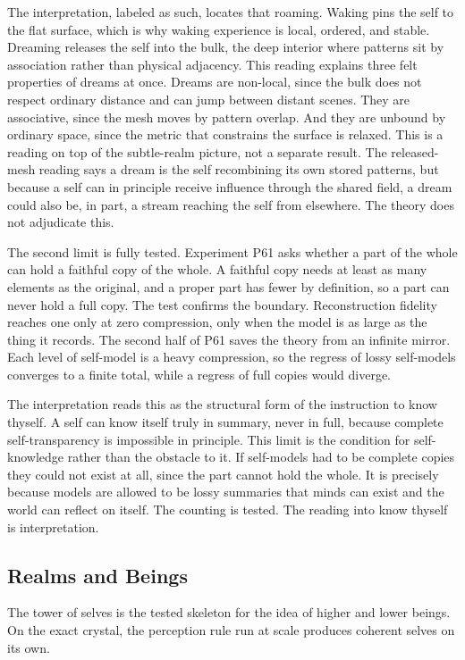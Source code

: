 The interpretation, labeled as such, locates that roaming. Waking pins the self to the flat surface, which is why waking experience is local, ordered, and stable. Dreaming releases the self into the bulk, the deep interior where patterns sit by association rather than physical adjacency. This reading explains three felt properties of dreams at once. Dreams are non-local, since the bulk does not respect ordinary distance and can jump between distant scenes. They are associative, since the mesh moves by pattern overlap. And they are unbound by ordinary space, since the metric that constrains the surface is relaxed. This is a reading on top of the subtle-realm picture, not a separate result. The released-mesh reading says a dream is the self recombining its own stored patterns, but because a self can in principle receive influence through the shared field, a dream could also be, in part, a stream reaching the self from elsewhere. The theory does not adjudicate this.

The second limit is fully tested. Experiment P61 asks whether a part of the whole can hold a faithful copy of the whole. A faithful copy needs at least as many elements as the original, and a proper part has fewer by definition, so a part can never hold a full copy. The test confirms the boundary. Reconstruction fidelity reaches one only at zero compression, only when the model is as large as the thing it records. The second half of P61 saves the theory from an infinite mirror. Each level of self-model is a heavy compression, so the regress of lossy self-models converges to a finite total, while a regress of full copies would diverge.

The interpretation reads this as the structural form of the instruction to know thyself. A self can know itself truly in summary, never in full, because complete self-transparency is impossible in principle. This limit is the condition for self-knowledge rather than the obstacle to it. If self-models had to be complete copies they could not exist at all, since the part cannot hold the whole. It is precisely because models are allowed to be lossy summaries that minds can exist and the world can reflect on itself. The counting is tested. The reading into know thyself is interpretation.

\subsection{Realms and Beings}

The tower of selves is the tested skeleton for the idea of higher and lower beings. On the exact crystal, the perception rule run at scale produces coherent selves on its own.

